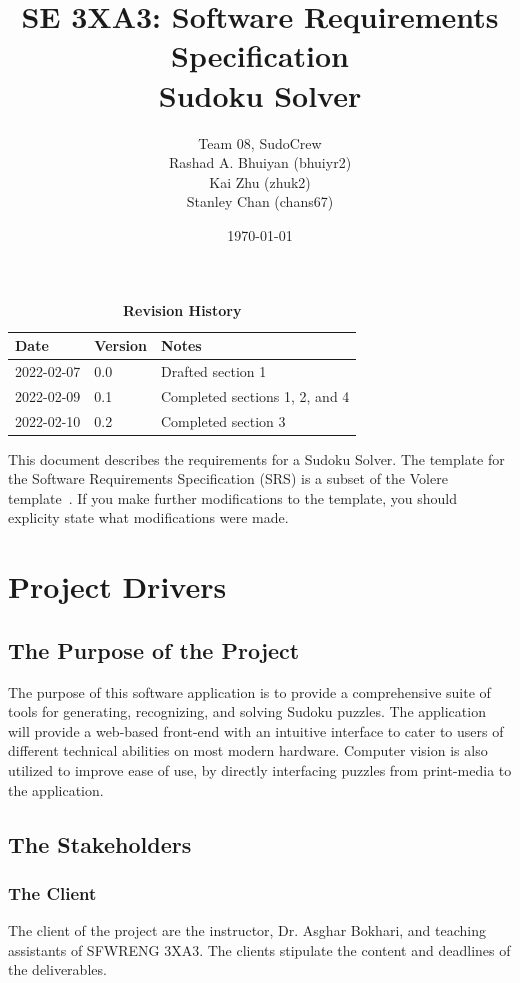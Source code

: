 \documentclass[11pt]{article}
\title{SE 3XA3: Software Requirements Specification\\Sudoku Solver}
\author{Team 08, SudoCrew
		\\ Rashad A. Bhuiyan (bhuiyr2)
		\\ Kai Zhu (zhuk2)
		\\ Stanley Chan (chans67)
}
\date{\today}
\begin{document}
\maketitle

\tableofcontents
\listoftables
\listoffigures

\begin{table}[bp]
\caption{\bf Revision History}
\begin{tabularx}{\textwidth}{p{3cm}p{2cm}X}
\toprule {\bf Date} & {\bf Version} & {\bf Notes}\\
\midrule
2022-02-07 & 0.0 & Drafted section 1\\
2022-02-09 & 0.1 & Completed sections 1, 2, and 4\\
2022-02-10 & 0.2 & Completed section 3\\
\bottomrule
\end{tabularx}
\end{table}

\newpage


This document describes the requirements for a Sudoku Solver.  The template for the Software
Requirements Specification (SRS) is a subset of the Volere
template~\citep{RobertsonAndRobertson2012}.  If you make further modifications
to the template, you should explicity state what modifications were made.

\section{Project Drivers}

\subsection{The Purpose of the Project}
The purpose of this software application is to provide a comprehensive suite of tools for generating, recognizing, and solving Sudoku puzzles. The application will provide a web-based front-end with an intuitive interface to cater to users of different technical abilities on most modern hardware. Computer vision is also utilized to improve ease of use, by directly interfacing puzzles from print-media to the application.

\subsection{The Stakeholders}
\subsubsection{The Client}
The client of the project are the instructor, Dr. Asghar Bokhari, and teaching assistants of SFWRENG 3XA3. The clients stipulate the content and deadlines of the deliverables.
\end{document}
